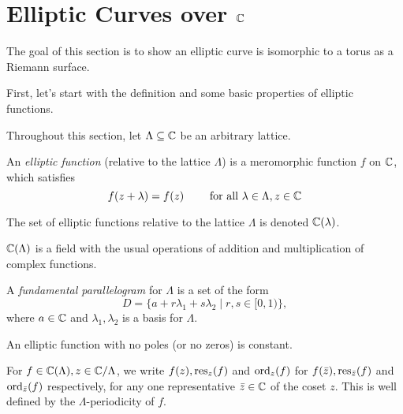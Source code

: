 \section{Elliptic Curves over \texorpdfstring{$\mathbb{C}$}{C}}
\label{sec:over-C}

The goal of this section is to show an elliptic curve is
isomorphic to a torus as a Riemann surface.

First, let's start with the definition and some basic properties of elliptic functions.

Throughout this section, let $\Lambda \subseteq \mathbb{C}$ be an arbitrary lattice.

\begin{definition}
	An \emph{elliptic function} (relative to the lattice $\Lambda$) is a meromorphic function
	$f$ on $\mathbb{C}$, which satisfies
	\begin{equation*}
		f(z + \lambda) = f(z)\qquad\textrm{ for all } \lambda \in \Lambda, z \in \mathbb{C}
	\end{equation*}
\end{definition}

\begin{notation}
	The set of elliptic functions relative to the lattice $\Lambda$ is denoted
	$\mathbb{C}(\lambda)$.
\end{notation}

\begin{remark}
	$\mathbb{C}(\Lambda)$ is a field with the usual operations of 
	addition and multiplication of complex functions.
\end{remark}

\begin{definition}
	A \emph{fundamental parallelogram} for $\Lambda$ is a set of the form
	\begin{equation*}
		D = \{a + r \lambda_1 + s \lambda_2 \mid r, s \in [0, 1)\},
	\end{equation*}
	where $a \in \mathbb{C}$ and $\lambda_1, \lambda_2$ is a basis for $\Lambda$.
\end{definition}

\begin{proposition}
	\label{prop:no-poles}
	An elliptic function with no poles (or no zeros) is constant.
\end{proposition}

\begin{notation}
	For $f \in \mathbb{C}(\Lambda), z \in \mathbb{C}/\Lambda$, we write $f(z), \operatorname{res}_z(f)$ and $\operatorname{ord}_z(f)$ for
	$f(\bar{z}), \operatorname{res}_{\bar{z}}(f)$ and $\operatorname{ord}_{\bar{z}}(f)$ respectively,
	for any one representative
	$\bar{z} \in \mathbb{C}$ of the coset $z$. This is well defined by the
	$\Lambda$-periodicity of $f$.
\end{notation}

